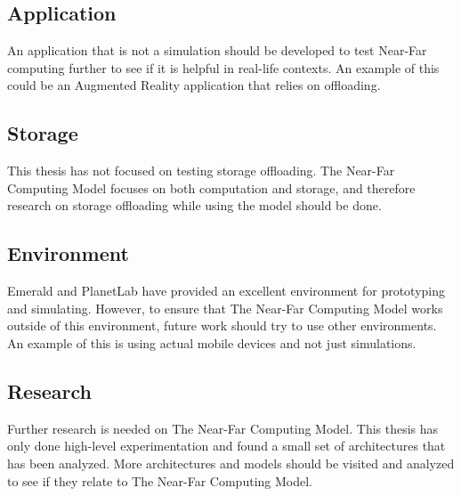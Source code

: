 \subsection{Application}
An application that is not a simulation should be developed to test Near-Far computing further to see if it is helpful in real-life contexts. An example of this could be an Augmented Reality application that relies on offloading. 

\subsection{Storage}
This thesis has not focused on testing storage offloading. The Near-Far Computing Model focuses on both computation and storage, and therefore research on storage offloading while using the model should be done.

\subsection{Environment}
Emerald and PlanetLab have provided an excellent environment for prototyping and simulating. However, to ensure that The Near-Far Computing Model works outside of this environment, future work should try to use other environments. An example of this is using actual mobile devices and not just simulations.

\subsection{Research}
Further research is needed on The Near-Far Computing Model. This thesis has only done high-level experimentation and found a small set of architectures that has been analyzed. More architectures and models should be visited and analyzed to see if they relate to The Near-Far Computing Model.

